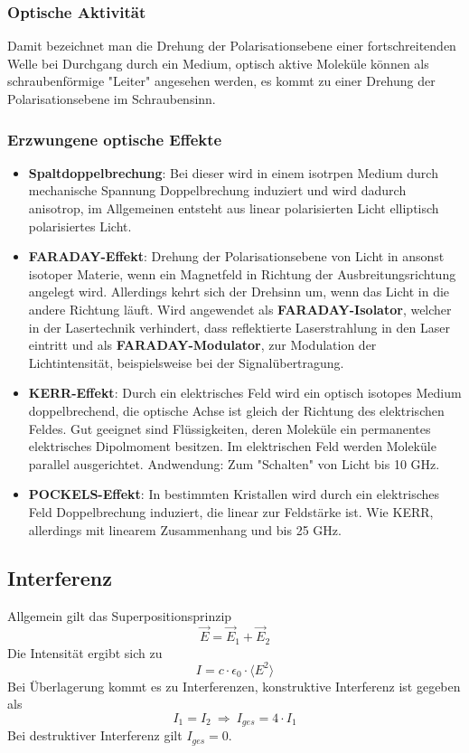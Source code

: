 \documentclass[12pt,a4paper,ngerman]{article}
\begin{document}
\subsubsection{Optische Aktivität}
Damit bezeichnet man die Drehung der Polarisationsebene einer fortschreitenden Welle bei Durchgang durch ein Medium, optisch aktive Moleküle können als schraubenförmige "Leiter" angesehen werden, es kommt zu einer Drehung der Polarisationsebene im Schraubensinn. 

\subsubsection{Erzwungene optische Effekte}
\begin{itemize}
\item \textbf{Spaltdoppelbrechung}: Bei dieser wird in einem isotrpen Medium durch mechanische Spannung Doppelbrechung induziert und wird dadurch anisotrop, im Allgemeinen entsteht aus linear polarisierten Licht elliptisch polarisiertes Licht. 
\item \textbf{FARADAY-Effekt}: Drehung der Polarisationsebene von Licht in ansonst isotoper Materie, wenn ein Magnetfeld in Richtung der Ausbreitungsrichtung angelegt wird. Allerdings kehrt sich der Drehsinn um, wenn das Licht in die andere Richtung läuft. Wird angewendet als \textbf{FARADAY-Isolator}, welcher in der Lasertechnik verhindert, dass reflektierte Laserstrahlung in den Laser eintritt und als \textbf{FARADAY-Modulator}, zur Modulation der Lichtintensität, beispielsweise bei der Signalübertragung. 
\item \textbf{KERR-Effekt}: Durch ein elektrisches Feld wird ein optisch isotopes Medium doppelbrechend, die optische Achse ist gleich der Richtung des elektrischen Feldes. Gut geeignet sind Flüssigkeiten, deren Moleküle ein permanentes elektrisches Dipolmoment besitzen. Im elektrischen Feld werden Moleküle parallel ausgerichtet. Andwendung: Zum "Schalten" von Licht bis 10 GHz.
\item \textbf{POCKELS-Effekt}: In bestimmten Kristallen wird durch ein elektrisches Feld Doppelbrechung induziert, die linear zur Feldstärke ist. Wie KERR, allerdings mit linearem Zusammenhang und bis 25 GHz. 
\end{itemize}

\subsection{Interferenz}
Allgemein gilt das Superpositionsprinzip
\begin{equation}
\vec{E} = \vec{E}_1 + \vec{E}_2
\end{equation}
Die Intensität ergibt sich zu 
\begin{equation}
I = c \cdot \epsilon_0 \cdot \langle E^2 \rangle
\end{equation}
Bei Überlagerung kommt es zu Interferenzen, konstruktive Interferenz ist gegeben als
\begin{equation}
I_1 = I_2 \ \Rightarrow \ I_{ges} = 4 \cdot I_1
\end{equation}
Bei destruktiver Interferenz gilt $I_{ges} = 0$. 
\end{document}
